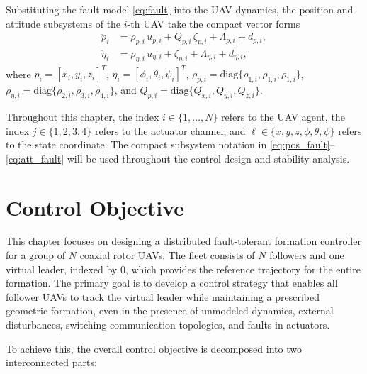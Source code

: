 Substituting the fault model \eqref{eq:fault} into the UAV dynamics, the position
and attitude subsystems of the $i$-th UAV take the compact vector forms
\begin{align}
\ddot{p}_i &= \rho_{p,i}\,u_{p,i} + Q_{p,i}\,\zeta_{p,i} + \Lambda_{p,i} + d_{p,i}, \label{eq:pos_fault}\\
\ddot{\eta}_i &= \rho_{\eta,i}\,u_{\eta,i} + \zeta_{\eta,i} + \Lambda_{\eta,i} + d_{\eta,i}, \label{eq:att_fault}
\end{align}
where $p_i = [x_i, y_i, z_i]^T$, $\eta_i = [\phi_i, \theta_i, \psi_i]^T$,
$\rho_{p,i} = \mathrm{diag}\{\rho_{1,i}, \rho_{1,i}, \rho_{1,i}\}$,
$\rho_{\eta,i} = \mathrm{diag}\{\rho_{2,i}, \rho_{3,i}, \rho_{4,i}\}$, and
$Q_{p,i} = \mathrm{diag}\{Q_{x,i}, Q_{y,i}, Q_{z,i}\}$.

\begin{remark}
Throughout this chapter, the index $i \in \{1, \ldots, N\}$ refers to the UAV
agent, the index $j \in \{1, 2, 3, 4\}$ refers to the actuator channel, and
$\ell \in \{x, y, z, \phi, \theta, \psi\}$ refers to the state coordinate. The
compact subsystem notation in \eqref{eq:pos_fault}--\eqref{eq:att_fault} will
be used throughout the control design and stability analysis.
\end{remark}
\section{Control Objective}
\label{sec5:control_objective}

This chapter focuses on designing a distributed fault-tolerant formation controller for a group of $N$ coaxial rotor UAVs. The fleet consists of $N$ followers and one virtual leader, indexed by 0, which provides the reference trajectory for the entire formation. The primary goal is to develop a control strategy that enables all follower UAVs to track the virtual leader while maintaining a prescribed geometric formation, even in the presence of unmodeled dynamics, external disturbances, switching communication topologies, and faults in actuators.

To achieve this, the overall control objective is decomposed into two interconnected parts:

